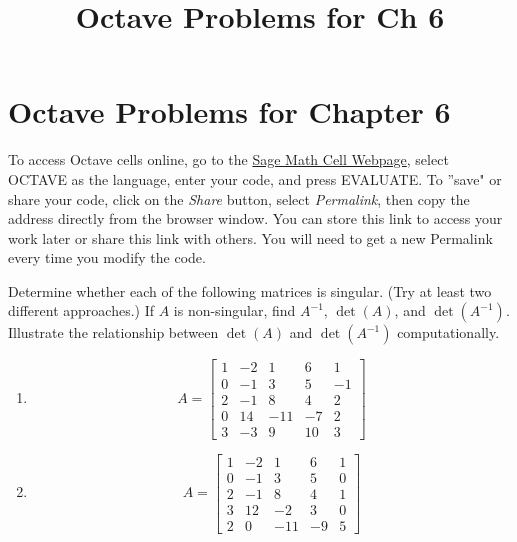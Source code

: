 \documentclass{ximera}
\title{Octave Problems for Ch 6} \license{CC BY-NC-SA 4.0}
\begin{document}
\begin{abstract}
\end{abstract}
\maketitle

\section*{Octave Problems for Chapter 6}

To access Octave cells online, go to the \href{https://sagecell.sagemath.org/}{Sage Math Cell Webpage}, select OCTAVE as the language, enter your code, and press EVALUATE.  
To ''save" or share your code, click on the \emph{Share} button, select \emph{Permalink}, then copy the address directly from the browser window.  You can store this link to access your work later or share this link with others.  You will need to get a new Permalink every time you modify the code.


\begin{problem}\label{prob_oct_det1}
Determine whether each of the following matrices is singular. (Try at least two different approaches.)  If $A$ is non-singular, find $A^{-1}$, $\det(A)$, and $\det(A^{-1})$.  Illustrate the relationship between $\det(A)$ and $\det(A^{-1})$ computationally.
\begin{enumerate}
    \item $$A=\begin{bmatrix}1 &-2 & 1 & 6 & 1\\0 & -1 & 3 & 5 & -1\\2 & -1 & 8 & 4 & 2\\0 & 14 & -11 & -7 & 2\\3 & -3 & 9 & 10 & 3\end{bmatrix}$$
    \item $$A=\begin{bmatrix}1 &-2 & 1 & 6 &1\\0 & -1 & 3 & 5 & 0\\2 & -1 & 8 & 4 & 1\\3 & 12 & -2 & 3 & 0\\2 & 0 & -11 & -9 & 5\end{bmatrix}$$
\end{enumerate}



  \end{problem}
\end{document}
